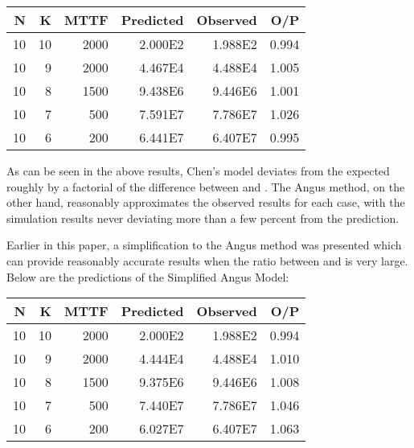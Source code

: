 \documentclass[XXX,endnotes]{usetex-v1}
\begin{document}
\begin{center}
  \begin{tabular}{ | r | r | r | r | r | r | }
    \hline
      N       & K        & MTTF     & Predicted    & Observed  & O/P         \\ \hline
      10      & 10       & 2000     & 2.000E2      & 1.988E2   & 0.994       \\ \hline
      10      & 9        & 2000     & 4.467E4      & 4.488E4   & 1.005       \\ \hline
      10      & 8        & 1500     & 9.438E6      & 9.446E6   & 1.001       \\ \hline
      10      & 7        & 500      & 7.591E7      & 7.786E7   & 1.026       \\ \hline
      10      & 6        & 200      & 6.441E7      & 6.407E7   & 0.995       \\ \hline
  \end{tabular}
\end{center}


As can be seen in the above results, Chen's model deviates from the expected roughly by a factorial of the difference between  and .  The Angus method, on the other hand, reasonably approximates the observed results for each case, with the simulation results never deviating more than a few percent from the prediction.

Earlier in this paper, a simplification to the Angus method was presented which can provide reasonably accurate results when the ratio between  and  is very large.  Below are the predictions of the Simplified Angus Model:

\begin{center}
  \begin{tabular}{ | r | r | r | r | r | r | }
    \hline
      N       & K        & MTTF     & Predicted    & Observed  & O/P         \\ \hline
      10      & 10       & 2000     & 2.000E2      & 1.988E2   & 0.994       \\ \hline
      10      & 9        & 2000     & 4.444E4      & 4.488E4   & 1.010       \\ \hline
      10      & 8        & 1500     & 9.375E6      & 9.446E6   & 1.008       \\ \hline
      10      & 7        & 500      & 7.440E7      & 7.786E7   & 1.046       \\ \hline
      10      & 6        & 200      & 6.027E7      & 6.407E7   & 1.063       \\ \hline
  \end{tabular}
\end{center}
\end{document}

